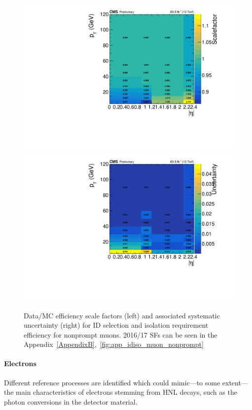 \begin{figure}[h]
  \centering
 \includegraphics[width=.48\textwidth]{Figures/c6/efficiencies/muons/2018/idiso_nonprompt_sf_2018.pdf}
\hfill{}
  \includegraphics[width=.48\textwidth]{Figures/c6/efficiencies/muons/2018/idiso_nonprompt_syst_2018.pdf}
  \caption{Data/MC efficiency scale factors (left) and associated
  systematic uncertainty (right) for ID selection and isolation
  requirement efficiency for nonprompt muons. 2016/17 SFs can be seen in the
  Appendix~\ref{AppendixB},~\ref{fig:app_idiso_muon_nonprompt}}
  \label{fig:idiso_muon_nonprompt}
\end{figure}

\paragraph{Electrons}\label{sec:eff_disp_ele}

Different reference processes are identified which could mimic---to
some extent---the main characteristics of \displ electrons 
stemming from HNL decays, such as the photon conversions in the
detector material.




